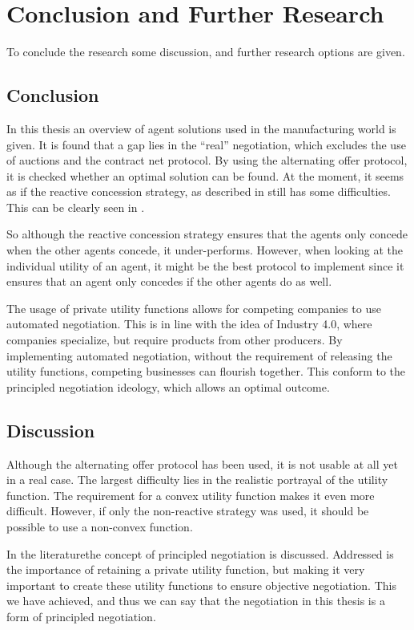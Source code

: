 \chapter{Conclusion and Further Research}
To conclude the research some discussion, and further research options are given.
\section{Conclusion}
In this thesis an overview of agent solutions used in the manufacturing world is given. It is found that a gap lies in the ``real'' negotiation, which excludes the use of auctions and the contract net protocol. By using the alternating offer protocol, it is checked whether an optimal solution can be found. At the moment, it seems as if the reactive concession strategy, as described in \citet{zheng2015automated} still has some difficulties. This can be clearly seen in . 

So although the reactive concession strategy ensures that the agents only concede when the other agents concede, it under-performs. However, when looking at the individual utility of an agent, it might be the best protocol to implement since it ensures that an agent only concedes if the other agents do as well.

The usage of private utility functions allows for competing companies to use automated negotiation. This is in line with the idea of Industry 4.0, where companies specialize, but require products from other producers. By implementing automated negotiation, without the requirement of releasing the utility functions, competing businesses can flourish together. This conform to the principled negotiation ideology, which allows an optimal outcome.

\section{Discussion}
Although the alternating offer protocol has been used, it is not usable at all yet in a real case. The largest difficulty lies in the realistic portrayal of the utility function. The requirement for a convex utility function makes it even more difficult. However, if only the non-reactive strategy was used, it should be possible to use a non-convex function.

In the literaturethe concept of principled negotiation is discussed. Addressed is the importance of retaining a private utility function, but making it very important to create these utility functions to ensure objective negotiation. This we have achieved, and thus we can say that the negotiation in this thesis is a form of principled negotiation.

